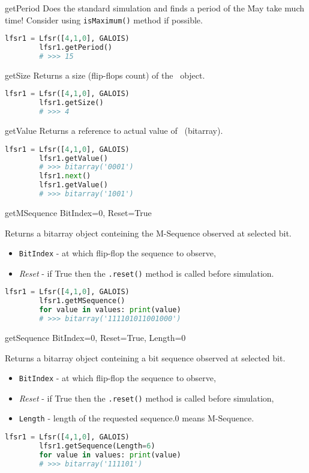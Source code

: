  {getPeriod} {} {
	Does the standard simulation and finds a period of the \Lfsr\. May take much time! Consider using \texttt{isMaximum()} method if possible.
}
\begin{lstlisting}[language=Python]
		lfsr1 = Lfsr([4,1,0], GALOIS)
		lfsr1.getPeriod()
		# >>> 15
\end{lstlisting}

 {getSize} {} {
	Returns a size (flip-flops count) of the \Lfsr\ object.
}
\begin{lstlisting}[language=Python]
		lfsr1 = Lfsr([4,1,0], GALOIS)
		lfsr1.getSize()
		# >>> 4
\end{lstlisting}

 {getValue} {} {
	Returns a reference to actual value of \Lfsr\ (bitarray).
}
\begin{lstlisting}[language=Python]
		lfsr1 = Lfsr([4,1,0], GALOIS)
		lfsr1.getValue()
		# >>> bitarray('0001')
		lfsr1.next()
		lfsr1.getValue()
		# >>> bitarray('1001')
\end{lstlisting}

 {getMSequence} {BitIndex=0, Reset=True} {
	Returns a bitarray object conteining the M-Sequence observed at selected bit.
	\begin{itemize}
		\item \texttt{BitIndex} - at which flip-flop the sequence to observe,
		\item \textit{Reset} - if True then the \texttt{.reset()} method is called before simulation.
	\end{itemize}
}
\begin{lstlisting}[language=Python]
		lfsr1 = Lfsr([4,1,0], GALOIS)
		lfsr1.getMSequence()
		for value in values: print(value)
		# >>> bitarray('111101011001000')
\end{lstlisting}

 {getSequence} {BitIndex=0, Reset=True, Length=0} {
	Returns a bitarray object conteining a bit sequence observed at selected bit.
	\begin{itemize}
		\item \texttt{BitIndex} - at which flip-flop the sequence to observe,
		\item \textit{Reset} - if True then the \texttt{.reset()} method is called before simulation,
		\item \texttt{Length} - length of the requested sequence.0 means M-Sequence.
	\end{itemize}
}
\begin{lstlisting}[language=Python]
		lfsr1 = Lfsr([4,1,0], GALOIS)
		lfsr1.getSequence(Length=6)
		for value in values: print(value)
		# >>> bitarray('111101')
\end{lstlisting}

